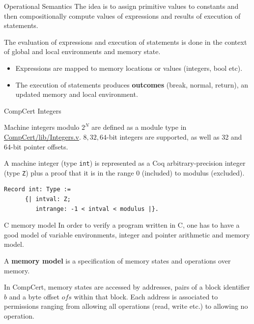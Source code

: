 \documentclass[10pt,usenames,dvipsnames,landscape]{beamer}
\begin{document}
  \begin{frame}[fragile]{Operational Semantics}
    The idea is to assign primitive values to constants and then compositionally compute values of expressions and results of execution of statements. 
    
    The evaluation of expressions and execution of statements is done in the context of global and local environments and memory state.
   \begin{itemize}
    
    \item Expressions are mapped to memory locations or values (integers, bool etc).
    \item The execution of statements produces {\bf outcomes} (break, normal, return), an updated memory and local environment. 
   \end{itemize}

   

\end{frame}


\begin{frame}[t,fragile]{CompCert Integers}

  Machine integers modulo $2^N$ are defined as a module type in \url{CompCert/lib/Integers.v}. $8, 32, 64$-bit integers are supported, as well as 32 and 64-bit pointer offsets.\\
  
\bigskip

A machine integer (type \texttt{int}) is represented as a Coq arbitrary-precision
integer (type \texttt{Z}) plus a proof that it is in the range 0 (included) to
modulus (excluded).


\begin{lstlisting}[language=Coq]
Record int: Type :=
      {| intval: Z;
         intrange: -1 < intval < modulus |}.
\end{lstlisting}

\end{frame}
  

   
\begin{frame}{C memory model}
   In order to verify a program written in C, one has to have a good model of variable environments, integer and pointer arithmetic and memory model. 
   
    A {\bf memory model} is a specification of memory states and operations over memory.
    
    In CompCert, memory states are accessed by addresses, pairs of a block
  identifier $b$ and a byte offset $ofs$ within that block.
  Each address is associated to permissions ranging from allowing all operations (read, write etc.) to allowing no operation.
\end{frame}
\end{document}
